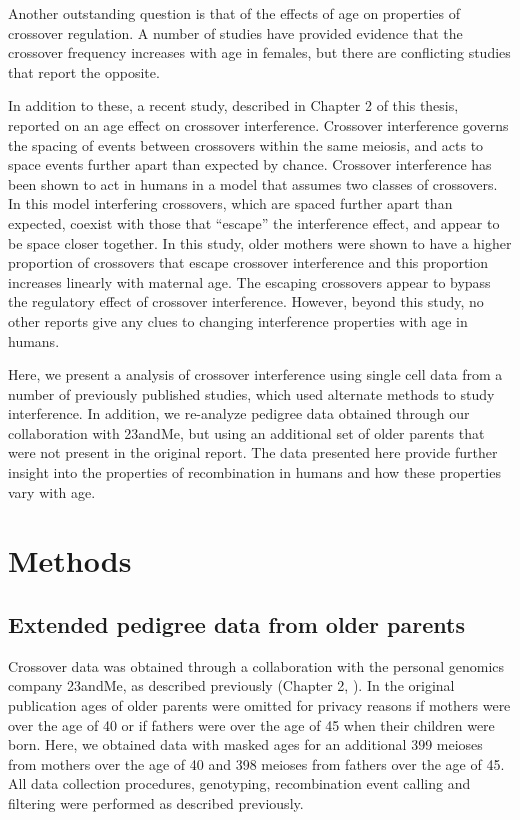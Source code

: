 Another outstanding question is that of the effects of age on properties of crossover regulation.
A number of studies have provided evidence that the crossover frequency increases with age in females\cite{Kong2004,Martin2015}, but there are conflicting studies that report the opposite\cite{Bleazard2013,Hussin2011}.

In addition to these, a recent study, described in Chapter 2 of this thesis, reported on an age effect on crossover interference.
Crossover interference governs the spacing of events between crossovers within the same meiosis, and acts to space events further apart than expected by chance.
Crossover interference has been shown to act in humans\cite{Broman2000,Housworth2003} in a model that assumes two classes of crossovers.
In this model interfering crossovers, which are spaced further apart than expected, coexist with those that ``escape'' the interference effect, and appear to be space closer together.
In this study, older mothers were shown to have a higher proportion of crossovers that escape crossover interference and this proportion increases linearly with maternal age\cite{Campbell2015}.
The escaping crossovers appear to bypass the regulatory effect of crossover interference.
However, beyond this study, no other reports give any clues to changing interference properties with age in humans.

Here, we present a analysis of crossover interference using single cell data from a number of previously published studies, which used alternate methods to study interference.
In addition, we re-analyze pedigree data obtained through our collaboration with 23andMe, but using an additional set of older parents that were not present in the original report.
The data presented here provide further insight into the properties of recombination in humans and how these properties vary with age.



\section{Methods}

\subsection{Extended pedigree data from older parents}
Crossover data was obtained through a collaboration with the personal genomics company 23andMe, as described previously (Chapter 2, \citet{Campbell2015}).
In the original publication ages of older parents were omitted for privacy reasons if mothers were over the age of 40 or if fathers were over the age of 45 when their children were born.
Here, we obtained data with masked ages for an additional 399 meioses from mothers over the age of 40 and 398 meioses from fathers over the age of 45.
All data collection procedures, genotyping, recombination event calling and filtering were performed as described previously.

